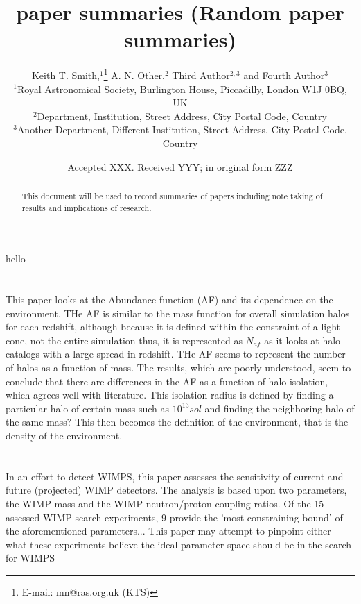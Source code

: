 \documentclass[fleqn,usenatbib]{mnras}
\title[paper summaries]{paper summaries (Random paper summaries)}
\author[K. T. Smith et al.]{
Keith T. Smith,$^{1}$\thanks{E-mail: mn@ras.org.uk (KTS)}
A. N. Other,$^{2}$
Third Author$^{2,3}$
and Fourth Author$^{3}$
\\
$^{1}$Royal Astronomical Society, Burlington House, Piccadilly, London W1J 0BQ, UK\\
$^{2}$Department, Institution, Street Address, City Postal Code, Country\\
$^{3}$Another Department, Different Institution, Street Address, City Postal Code, Country
}
\date{Accepted XXX. Received YYY; in original form ZZZ}
\begin{document}
\label{firstpage}
\pagerange{\pageref{firstpage}--\pageref{lastpage}}
\maketitle

\begin{abstract}
This document will be used to record summaries of papers including note taking of results and implications of research.
\end{abstract}

\begin{keywords}
hello
\end{keywords}




\section{\citet{Chira_18}}
This paper looks at the Abundance function (AF) and its dependence on the environment. THe AF is similar to the mass function for overall simulation halos for each redshift, although because it is defined within the constraint of a light cone, not the entire simulation thus, it is represented as $N_{af}$ as it looks at halo catalogs with a large spread in redshift. THe AF seems to represent the number of halos as a function of mass. The results, which are poorly understood, seem to conclude that there are differences in the AF as a function of halo isolation, which agrees well with literature. This isolation radius is defined by finding a particular halo of certain mass such as $10^{13} sol$ and finding the neighboring halo of the same mass? This then becomes the definition of the environment, that is the density of the environment.

\section{\citet{Kang_18}}
In an effort to detect WIMPS, this paper assesses the sensitivity of current and future (projected) WIMP detectors. The analysis is based upon two parameters, the WIMP mass and the WIMP-neutron/proton coupling ratios. Of the 15 assessed WIMP search experiments, 9 provide the 'most constraining bound' of the aforementioned parameters... This paper may attempt to pinpoint either what these experiments believe the ideal parameter space should be in the search for WIMPS
\end{document}
